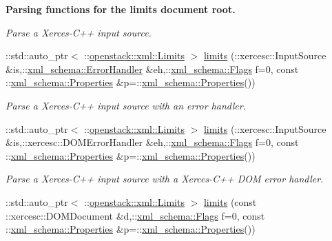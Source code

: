 \begin{Indent}{\bf Parsing functions for the limits document root.}
\begin{DoxyCompactItemize}
\begin{DoxyCompactList}\small\item\em Parse a Xerces-\/C++ input source. \item\end{DoxyCompactList}\item 
::std::auto\_\-ptr$<$ ::\hyperlink{classopenstack_1_1xml_1_1Limits}{openstack::xml::Limits} $>$ \hyperlink{namespaceopenstack_1_1xml_ad79efe255bcb278b52b1cdfaa6d7d738}{limits} (::xercesc::InputSource \&is,::\hyperlink{namespacexml__schema_ab1c9361bfd3b404eaabf0c31eded79dc}{xml\_\-schema::ErrorHandler} \&eh,::\hyperlink{namespacexml__schema_affb4c227cbd9aa7453dd1dc5a1401943}{xml\_\-schema::Flags} f=0, const ::\hyperlink{namespacexml__schema_ad27ce19a7ee1d3b1064092648898f64c}{xml\_\-schema::Properties} \&p=::\hyperlink{namespacexml__schema_ad27ce19a7ee1d3b1064092648898f64c}{xml\_\-schema::Properties}())
\begin{DoxyCompactList}\small\item\em Parse a Xerces-\/C++ input source with an error handler. \item\end{DoxyCompactList}\item 
::std::auto\_\-ptr$<$ ::\hyperlink{classopenstack_1_1xml_1_1Limits}{openstack::xml::Limits} $>$ \hyperlink{namespaceopenstack_1_1xml_aa5415be8dd9beee0ae7567485067506c}{limits} (::xercesc::InputSource \&is,::xercesc::DOMErrorHandler \&eh,::\hyperlink{namespacexml__schema_affb4c227cbd9aa7453dd1dc5a1401943}{xml\_\-schema::Flags} f=0, const ::\hyperlink{namespacexml__schema_ad27ce19a7ee1d3b1064092648898f64c}{xml\_\-schema::Properties} \&p=::\hyperlink{namespacexml__schema_ad27ce19a7ee1d3b1064092648898f64c}{xml\_\-schema::Properties}())
\begin{DoxyCompactList}\small\item\em Parse a Xerces-\/C++ input source with a Xerces-\/C++ DOM error handler. \item\end{DoxyCompactList}\item 
::std::auto\_\-ptr$<$ ::\hyperlink{classopenstack_1_1xml_1_1Limits}{openstack::xml::Limits} $>$ \hyperlink{namespaceopenstack_1_1xml_afd67b55d3ba756adc48284b0c172fe8e}{limits} (const ::xercesc::DOMDocument \&d,::\hyperlink{namespacexml__schema_affb4c227cbd9aa7453dd1dc5a1401943}{xml\_\-schema::Flags} f=0, const ::\hyperlink{namespacexml__schema_ad27ce19a7ee1d3b1064092648898f64c}{xml\_\-schema::Properties} \&p=::\hyperlink{namespacexml__schema_ad27ce19a7ee1d3b1064092648898f64c}{xml\_\-schema::Properties}())

\end{DoxyCompactItemize}
\end{Indent}
